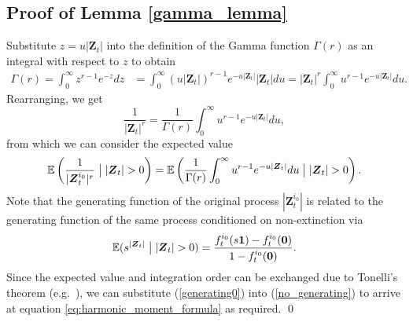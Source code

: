 \documentclass[preprint,3p,12pt]{elsarticle}
\theoremstyle{definition}
\begin{document}
\subsection{Proof of Lemma \ref{gamma_lemma}}\label{gamma}
Substitute $z=u|\boldsymbol{Z}_t|$ into the definition of the Gamma function $\Gamma(r)$ as an integral with respect to $z$ to obtain
\begin{align*}
   \Gamma(r) = \int_0^{\infty} z^{r-1} e^{-z} dz %
   & = \int_0^{\infty} (u|\boldsymbol{Z}_t|)^{r-1} e^{-u|\boldsymbol{Z}_t|} |\boldsymbol{Z}_t| du 
   =|\boldsymbol{Z}_t|^r \int_0^{\infty} u^{r-1} e^{-u|\boldsymbol{Z}_t|} du.
   \end{align*} 
   Rearranging, we get
   \begin{equation*}
       \frac{1}{|\boldsymbol{Z}_t|^r} = \frac{1}{\Gamma(r)} \int_0^{\infty} u^{r-1} e^{-u|\boldsymbol{Z}_t|} du,
   \end{equation*}
   from which we can consider the expected value
   \begin{equation}
        \mathbb{E}\left(\frac{1}{|\boldsymbol{Z}_t^{i_0}|^r} \bigm| |\boldsymbol{Z}_t| > 0\right)  = \mathbb{E}\left(\frac{1}{\Gamma(r)}\int_0^{\infty} u^{r-1} e^{-u|\boldsymbol{Z}_t|} du \bigm| |\boldsymbol{Z}_t| > 0 \right). \label{no_generating}
   \end{equation}
   Note that the generating function of the original process $|\boldsymbol{Z}_t^{i_0}|$ is related to the generating function of the same process conditioned on non-extinction via
\begin{equation}
    \mathbb{E}(s^{|\boldsymbol{Z}_t|} \bigm| |\boldsymbol{Z}_t| > 0) = \frac{f_t^{i_0}(s\boldsymbol{1})- f_t^{i_0}(\boldsymbol{0})}{1-f_t^{i_0}(\boldsymbol{0})}. \label{generating0}
\end{equation}
 Since the expected value and integration order can be exchanged due to Tonelli's theorem (e.g.\ \cite[Theorem 1.29, p.\ 25]{kallenberg}), we can substitute (\ref{generating0}) into (\ref{no_generating}) to arrive at equation \eqref{eq:harmonic_moment_formula}
as required. \qed
\end{document}
